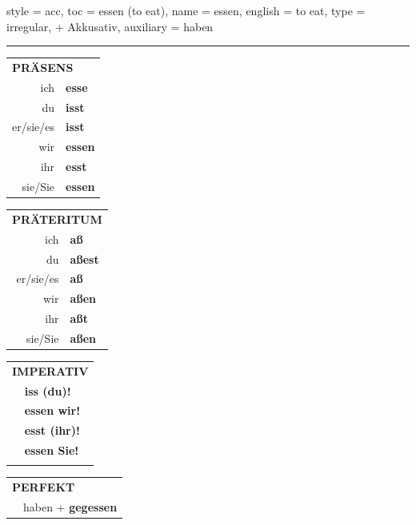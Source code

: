 \begin{verbentry}{
  style = {acc},
  toc = {essen (to eat)},
  name = {essen},
  english = {to eat},
  type = {irregular, + Akkusativ},
  auxiliary = {haben}
}
 
    
     \vspace{5pt}

    \hrule
    
    \vspace{5pt}

  \begin{tabular}{rl}
     \multicolumn{2}{l}{\textbf{PRÄSENS} }\\
    ich & \textbf{esse}\\
    du & \textbf{isst}\\
    er/sie/es & \textbf{isst}\\
    wir & \textbf{essen}\\
    ihr & \textbf{esst}\\
    sie/Sie & \textbf{essen}\\
  \end{tabular}
  \hfill
     \begin{tabular}{rl}
    \multicolumn{2}{l}{\textbf{PRÄTERITUM} }\\
    ich & \textbf{aß}\\
    du & \textbf{aßest}\\
    er/sie/es & \textbf{aß}\\
    wir & \textbf{aßen}\\
    ihr & \textbf{aßt}\\
    sie/Sie & \textbf{aßen}\\
  \end{tabular}
  \hfill
  \begin{tabular}{rl}
     \multicolumn{2}{l}{\textbf{IMPERATIV} }\\
   & \textbf{iss (du)!}\\
   & \textbf{essen wir!}\\
   & \textbf{esst (ihr)!}\\
   & \textbf{essen Sie!}\\
   & \vspace{10pt}
  \end{tabular}

    \vspace{10pt}

 \begin{tabular}{rl}
     \multicolumn{2}{l}{\textbf{PERFEKT}}\\
  &  haben + \textbf{gegessen}\\
  \end{tabular}
\hfill
   \begin{tabular}{rl}
   

\end{tabular}
\end{verbentry}
